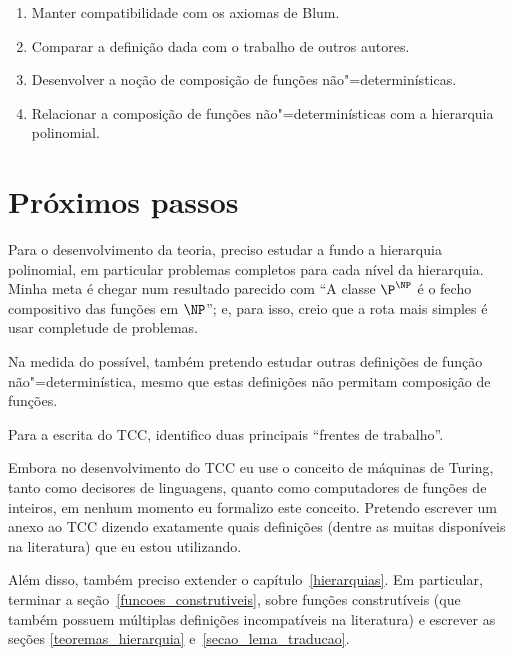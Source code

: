 \begin{enumerate}
    \item Manter compatibilidade com os axiomas de Blum.
    \item Comparar a definição dada com o trabalho de outros autores.
    \item Desenvolver a noção de composição de funções não"=determinísticas.
    \item Relacionar a composição de funções não"=determinísticas
        com a hierarquia polinomial.
\end{enumerate}

\section{Próximos passos}

Para o desenvolvimento da teoria,
preciso estudar a fundo a hierarquia polinomial,
em particular problemas completos para cada nível da hierarquia.
Minha meta é chegar num resultado parecido com
``A classe $\P^\NP$ é o fecho compositivo das funções em $\NP$'';
e, para isso,
creio que a rota mais simples é usar completude de problemas.

Na medida do possível,
também pretendo estudar outras definições de função não"=determinística,
mesmo que estas definições não permitam composição de funções.

Para a escrita do TCC,
identifico duas principais ``frentes de trabalho''.

Embora no desenvolvimento do TCC eu use o conceito de máquinas de Turing,
tanto como decisores de linguagens,
quanto como computadores de funções de inteiros,
em nenhum momento eu formalizo este conceito.
Pretendo escrever um anexo ao TCC dizendo exatamente quais definições
(dentre as muitas disponíveis na literatura)
que eu estou utilizando.

Além disso, também preciso extender o capítulo~\ref{hierarquias}.
Em particular,
terminar a seção~\ref{funcoes_construtiveis},
sobre funções construtíveis
(que também possuem múltiplas definições incompatíveis na literatura)
e escrever as seções \ref{teoremas_hierarquia} e~\ref{secao_lema_traducao}.
